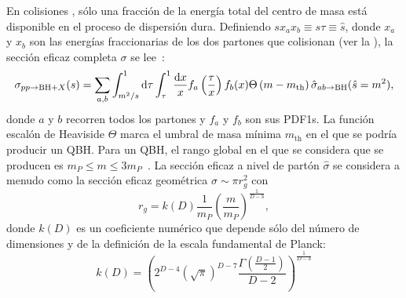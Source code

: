 En colisiones \pp, sólo una fracción de la energía total del centro de masa \sqs está disponible en el proceso de dispersión dura. Definiendo \(sx_ax_b \equiv s \tau \equiv \hat{s}\), donde \(x_a\) y \(x_b\) son las energías fraccionarias de los dos partones que colisionan (ver la \Sect{\ref{subsec:theory:sm:hadron_interactions}}), la sección eficaz completa \(\sigma\) se lee~\cite{Gingrich_Undseth-2020}:
\begin{equation*}
    \sigma_{pp \rightarrow \text{BH} + X}(s) =
    \sum_{a,b}
        \int_{m^2/s}^{1} \dd{\tau}
            \int_{\tau}^{1}
            \frac{\dd{x}}{x}
            f_a\left(\frac{\tau}{x}\right)
            f_b(x)
            \Theta\left(m - m_{\text{th}}\right)
            \hat{\sigma}_{ab\rightarrow \text{BH}} (\hat{s} = m^2),
\end{equation*}
donde \(a\) y \(b\) recorren todos los partones y \(f_a\) y \(f_b\) son sus \acp{PDF1}. La función escalón de Heaviside \(\Theta\) marca el umbral de masa mínima \(m_{\text{th}}\) en el que se podría producir un \ac{QBH}.
Para un \ac{QBH}, el rango global en el que se considera que se producen es \(m_P \leq m \leq 3m_P\)~\cite{Gingrich-2010}.
La sección eficaz a nivel de partón \(\hat{\sigma}\) se considera a menudo como la sección eficaz geométrica \(\sigma \sim \pi r_g^2\) con
\begin{equation*}
    r_g = k(D) \frac{1}{m_P} \left(\frac{m}{m_P}\right)^{\frac{1}{D-3}},
\end{equation*}
donde \(k(D)\) es un coeficiente numérico que depende sólo del número de dimensiones y de la definición de la escala fundamental de Planck:
\begin{equation*}
    k(D) = 
    \left(
        2^{D-4}
        \left(\sqrt{\pi}\right)^{D-7}
        \frac{\Gamma \left(\frac{D-1}{2}\right)}{D-2}
    \right)
    ^{\frac{1}{D-3}}
\end{equation*}

